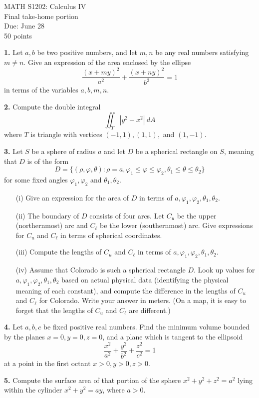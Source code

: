 \documentclass{article}
\begin{document}
\begin{center}
MATH S1202: Calculus IV \\ 
Final take-home portion \\
Due: June 28 \\
50 points
\end{center}

\noindent \textbf{1.} Let $a,b$ be two positive numbers, and let $m, n$ be any real numbers satisfying $m \ne n$. Give an expression of the area enclosed by the ellipse
\[
\frac{(x+my)^2}{a^2} + \frac{(x + ny)^2}{b^2} = 1
\]
in terms of the variables $a,b,m,n$.  


\vspace{3mm}

\noindent \textbf{2.} Compute the double integral 
\[
\iint_T \left|y^2 - x^2\right| \: dA
\]
where $T$ is triangle with vertices $(-1,1), (1,1),$ and $(1,-1)$. 


\vspace{3mm}

\noindent \textbf{3.} Let $S$ be a sphere of radius $a$ and let $D$ be a spherical rectangle on $S$, meaning that $D$ is of the form 
\[
D = \{(\rho, \varphi, \theta) : \rho = a, \varphi_1 \leqslant \varphi \leqslant \varphi_2, \theta_1 \leqslant \theta \leqslant \theta_2\}
\]
for some fixed angles $\varphi_1, \varphi_2$ and $\theta_1, \theta_2$. 
\begin{enumerate}
\item[(i)] Give an expression for the area of $D$ in terms of $a, \varphi_1, \varphi_2, \theta_1, \theta_2$. 
\item[(ii)] The boundary of $D$ consists of four arcs. Let $C_u$ be the upper (northernmost) arc and $C_\ell$ be the lower (southernmost) arc. Give expressions for $C_u$ and $C_\ell$ in terms of spherical coordinates. 
\item[(iii)] Compute the lengths of $C_u$ and $C_\ell$ in terms of $a, \varphi_1, \varphi_2, \theta_1, \theta_2$. 
\item[(iv)] Assume that Colorado is such a spherical rectangle $D$. Look up values for $a, \varphi_1, \varphi_2, \theta_1, \theta_2$ based on actual physical data (identifying the physical meaning of each constant), and compute the difference in the lengths of $C_u$ and $C_\ell$ for Colorado. Write your answer in meters. (On a map, it is easy to forget that the lengths of $C_u$ and $C_\ell$ are different.)
\end{enumerate}

\vspace{3mm}

\noindent \textbf{4.} Let $a,b,c$ be fixed positive real numbers. Find the minimum volume bounded by the planes $x = 0, y = 0, z = 0$, and a plane which is tangent to the ellipsoid 
\[
\frac{x^2}{a^2} + \frac{y^2}{b^2} + \frac{z^2}{c^2} = 1
\]
at a point in the first octant $x > 0, y > 0, z > 0$. 

\vspace{3mm}

\noindent \textbf{5.} Compute the surface area of that portion of the sphere $x^2 + y^2 + z^2 = a^2$ lying within the cylinder $x^2 + y^2 = ay$, where $a > 0$. 
\end{document}

